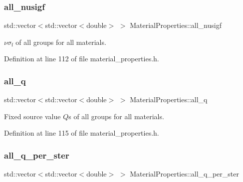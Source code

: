 \subsubsection{\texorpdfstring{all\+\_\+nusigf}{all\_nusigf}}
{\footnotesize\ttfamily std\+::vector$<$std\+::vector$<$double$>$ $>$ Material\+Properties\+::all\+\_\+nusigf\hspace{0.3cm}{\ttfamily [private]}}



$\nu\sigma_\mathrm{f}$ of all groups for all materials. 



Definition at line 112 of file material\+\_\+properties.\+h.

\mbox{\label{class_material_properties_a63087272811561aa476e594b6aa6f4a9}} 
\subsubsection{\texorpdfstring{all\+\_\+q}{all\_q}}
{\footnotesize\ttfamily std\+::vector$<$std\+::vector$<$double$>$ $>$ Material\+Properties\+::all\+\_\+q\hspace{0.3cm}{\ttfamily [private]}}



Fixed source value $Q$\textquotesingle{}s of all groups for all materials. 



Definition at line 115 of file material\+\_\+properties.\+h.

\mbox{\label{class_material_properties_a6ca548f222ef27140c7fc1876c97e6aa}} 
\subsubsection{\texorpdfstring{all\+\_\+q\+\_\+per\+\_\+ster}{all\_q\_per\_ster}}
{\footnotesize\ttfamily std\+::vector$<$std\+::vector$<$double$>$ $>$ Material\+Properties\+::all\+\_\+q\+\_\+per\+\_\+ster\hspace{0.3cm}{\ttfamily [private]}}



